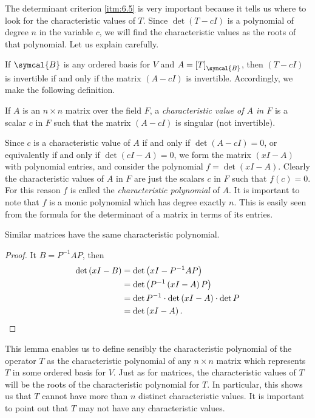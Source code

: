 The determinant criterion \ref{itm:6.5} is very important because it tells us where to look for the characteristic values of \(T\). Since \(\det\left(T-cI\right)\) is a polynomial of degree \(n\) in the variable \(c\), we will find the characteristic values as the roots of that polynomial. Let us explain carefully.

If \(\symcal{B}\) is any ordered basis for \(V\) and \(A=\left[T\right]_{\symcal{B}}\), then \(\left(T-cI\right)\) is invertible if and only if the matrix \(\left(A-cI\right)\) is invertible. Accordingly, we make the following definition.

\begin{definition}
    If \(A\) is an \(n\times n\) matrix over the field \(F\), a \emph{characteristic value of \(A\) in \(F\)} is a scalar \(c\) in \(F\) such that the matrix \(\left(A-cI\right)\) is singular (not invertible).
\end{definition}

Since \(c\) is a characteristic value of \(A\) if and only if \(\det\left(A-cI\right)=0\), or equivalently if and only if \(\det\left(cI-A\right)=0\), we form the matrix \(\left(xI-A\right)\) with polynomial entries, and consider the polynomial \(f=\det\left(xI-A\right)\). Clearly the characteristic values of \(A\) in \(F\) are just the scalars \(c\) in \(F\) such that \(f\left(c\right)=0\). For this reason \(f\) is called the \emph{characteristic polynomial} of \(A\). It is important to note that \(f\) is a monic polynomial which has degree exactly \(n\). This is easily seen from the formula for the determinant of a matrix in terms of its entries.

\begin{lemma}
    Similar matrices have the same characteristic polynomial.
    \begin{proof}
        It \(B=P^{-1}AP\), then
        \begin{align*}
            \det\left(xI-B\right)&=\det\left(xI-P^{-1}AP\right)\\
            &=\det\left(P^{-1}\left(xI-A\right)P\right)\\
            &=\det P^{-1}\cdot\det\left(xI-A\right)\cdot\det P\\
            &=\det\left(xI-A\right).\qedhere
        \end{align*}
    \end{proof}
\end{lemma}

This lemma enables us to define sensibly the characteristic polynomial of the operator \(T\) as the characteristic polynomial of any \(n\times n\) matrix which represents \(T\) in some ordered basis for \(V\). Just as for matrices, the characteristic values of \(T\) will be the roots of the characteristic polynomial for \(T\). In particular, this shows us that \(T\) cannot have more than \(n\) distinct characteristic values. It is important to point out that \(T\) may not have any characteristic values.

